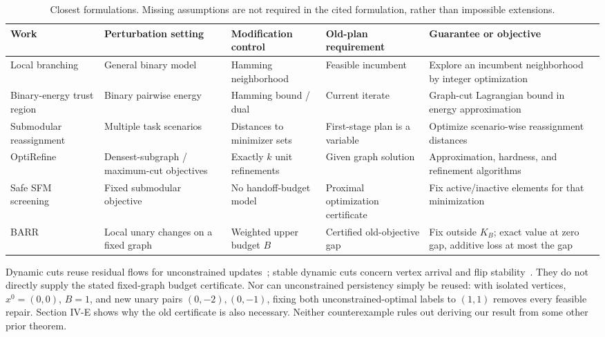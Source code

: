 \documentclass[conference]{IEEEtran}
\begin{document}
\begin{table}[t]
\caption{Closest formulations. Missing assumptions are not required in the cited formulation, rather than impossible extensions.}\label{tab:related}
\centering\footnotesize\setlength{\tabcolsep}{2pt}
\begin{tabular}{@{}>{\raggedright\arraybackslash}p{}>{\raggedright\arraybackslash}p{}>{\raggedright\arraybackslash}p{}>{\raggedright\arraybackslash}p{}>{\raggedright\arraybackslash}p{}@{}}
\toprule
Work & Perturbation setting & Modification control & Old-plan requirement & Guarantee or objective\\
\midrule
Local branching~\cite{fischetti2003local} & General binary model & Hamming neighborhood & Feasible incumbent & Explore an incumbent neighborhood by integer optimization\\
Binary-energy trust region~\cite{gorelick2014submodularization} & Binary pairwise energy & Hamming bound / dual & Current iterate & Graph-cut Lagrangian bound in energy approximation\\
Submodular reassignment~\cite{kakimura2022reassignment} & Multiple task scenarios & Distances to minimizer sets & First-stage plan is a variable & Optimize scenario-wise reassignment distances\\
OptiRefine~\cite{tu2025optirefine} & Densest-subgraph / maximum-cut objectives & Exactly $k$ unit refinements & Given graph solution & Approximation, hardness, and refinement algorithms\\
Safe SFM screening~\cite{zhang2018screening} & Fixed submodular objective & No handoff-budget model & Proximal optimization certificate & Fix active/inactive elements for that minimization\\
BARR & Local unary changes on a fixed graph & Weighted upper budget $B$ & Certified old-objective gap & Fix outside $K_B$; exact value at zero gap, additive loss at most the gap\\
\bottomrule
\end{tabular}
\end{table}

Dynamic cuts reuse residual flows for unconstrained updates~\cite{kohli2007dynamic}; stable dynamic cuts concern vertex arrival and flip stability~\cite{deberg2026stable}. They do not directly supply the stated fixed-graph budget certificate. Nor can unconstrained persistency simply be reused: with isolated vertices, $x^0=(0,0)$, $B=1$, and new unary pairs $(0,-2),(0,-1)$, fixing both unconstrained-optimal labels to $(1,1)$ removes every feasible repair. Section IV-E shows why the old certificate is also necessary. Neither counterexample rules out deriving our result from some other prior theorem.
\end{document}
